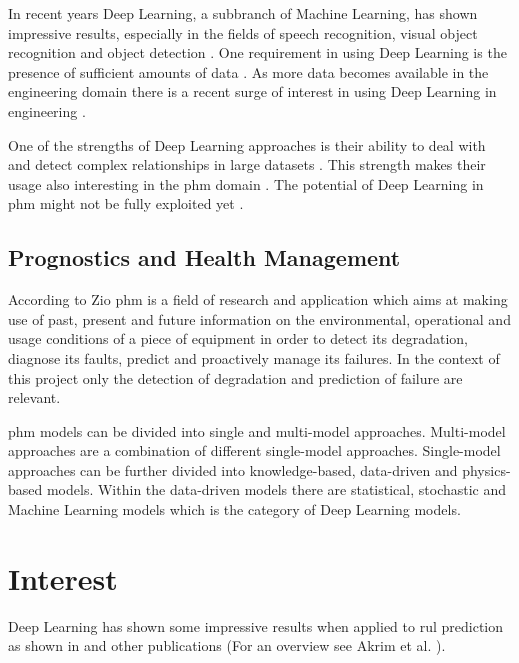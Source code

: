 \documentclass[conference]{IEEEtran}
\begin{document}
In recent years Deep Learning, a subbranch of Machine Learning, has shown impressive results, especially in the fields of speech recognition, visual object recognition and object detection \cite{LeCun2015}. One requirement in using Deep Learning is the presence of sufficient amounts of data \cite{Sikorska2011}. As more data becomes available in the engineering domain there is a recent surge of interest in using Deep Learning in engineering \cite{Voulodimos2018}.

One of the strengths of Deep Learning approaches is their ability to deal with and detect complex relationships in large datasets \cite{MONTEROJIMENEZ2020539}. This strength makes their usage also interesting in the \gls{phm} domain \cite{Wu2015}. The potential of Deep Learning in \gls{phm} might not be fully exploited yet \cite{Akrim2021}.

\noindent
\subsection{Prognostics and Health Management}

According to Zio \cite{Zio2012} \gls{phm} is a field of research and application which aims at making use of past, present and future information on the environmental, operational and usage conditions of a piece of equipment in order to detect its degradation, diagnose its faults, predict and proactively manage its failures. In the context of this project only the detection of degradation and prediction of failure are relevant.

\gls{phm} models can be divided into single and multi-model approaches. Multi-model approaches are a combination of different single-model approaches. Single-model approaches can be further divided into knowledge-based, data-driven and physics-based models. Within the data-driven models there are statistical, stochastic and Machine Learning models which is the category of Deep Learning models. \cite{MONTEROJIMENEZ2020539}

\section{Interest}
\label{sec:interest}

Deep Learning has shown some impressive results when applied to \gls{rul} prediction as shown in \cite{Xu2018, Li2018, Liu2019, Yuan2016, Wu2018, Park2020} and other publications (For an overview see Akrim et al. \cite{Akrim2021}).
\end{document}
